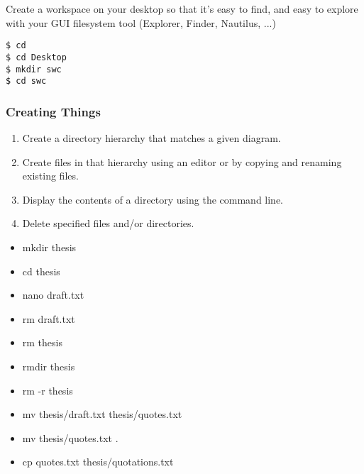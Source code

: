 \documentclass[xcolor=dvipsnames]{beamer}
\begin{document}
\begin{frame}[fragile]
Create a workspace on your desktop so that it's easy to find,
and easy to explore with your GUI filesystem tool
(Explorer, Finder, Nautilus, ...)
\begin{verbatim}
$ cd
$ cd Desktop
$ mkdir swc
$ cd swc
\end{verbatim}
\end{frame}

\begin{frame}
\frametitle{Creating Things}
\begin{enumerate}
\item    Create a directory hierarchy that matches a given diagram.
\item    Create files in that hierarchy using an editor or by copying and renaming existing files.
\item    Display the contents of a directory using the command line.
\item    Delete specified files and/or directories.
\end{enumerate}
\begin{multicols}{2}
\begin{itemize}
\item mkdir thesis
\item cd thesis
\item nano draft.txt
\item rm draft.txt
\item rm thesis
\item rmdir thesis
\item rm -r thesis
\item mv thesis/draft.txt thesis/quotes.txt
\item mv thesis/quotes.txt .
\item cp quotes.txt thesis/quotations.txt
\end{itemize}
\end{multicols}
\end{frame}

%
%
%
\end{document}
